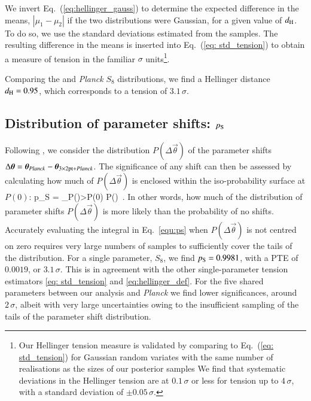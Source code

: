\begin{appendix}
We invert Eq.~(\ref{eq:hellinger_gauss}) to determine the expected difference in the means, $|\mu_1 - \mu_2|$ if the two distributions were Gaussian, for a given value of $d_{\rm H}$. To do so, we use the standard deviations estimated from the samples. The resulting difference in the means is inserted into Eq.~(\ref{eq: std_tension}) to obtain a measure of tension in the familiar $\sigma$ units\footnote{Our Hellinger tension measure is validated by comparing to Eq.~(\ref{eq: std_tension}) for Gaussian random variates with the same number of realisations as the sizes of our posterior samples %
We find that systematic deviations in the Hellinger tension are at $0.1\, \sigma$ or less for tension up to $4\,\sigma$, with a standard deviation of $\pm 0.05\, \sigma$.}.   

Comparing the \tttp and {\it Planck} $S_8$ distributions, we find a Hellinger distance $d_{\rm H}=0.95$, which corresponds to a tension of $3.1\,\sigma$.

\subsection{Distribution of parameter shifts: $p_{\rm S}$}
\label{app:paramshift} 
Following \citet[][see also \citealt{kohlinger/etal:2019}]{Raveri2020}, we consider the distribution $P(\Delta\vec\theta)$ of the parameter shifts $\Delta\vec\theta = \vec\theta_{\it Planck} - \vec\theta_{{\rm 3\times2pt+}{\it Planck}}$. 
The significance of any shift can then be assessed by calculating how much of $P(\Delta\vec\theta)$ is enclosed within the iso-probability surface at $P(0)$:
\be
\label{equ:ps}
	p_{\rm S} = \int_{P(\Delta\vec\theta)>P(0)} P(\Delta\vec\theta)\diff\Delta\vec\theta \, .
\ee
In other words, how much of the distribution of parameter shifts $P(\Delta\vec\theta)$ is more likely than the probability of no shifts. 
Accurately evaluating the integral in Eq.~\eqref{equ:ps} when $P(\Delta\vec\theta)$ is not centred on zero requires very large numbers of samples to sufficiently cover the tails of the distribution. 
For a single parameter, $S_{8}$, we find $p_{\rm S} = 0.9981$, with a PTE of $0.0019$, or $3.1\,\sigma$. 
This is in agreement with the other single-parameter tension estimators \eqref{eq: std_tension} and \eqref{eq:hellinger_def}. 
For the five shared parameters between our \tttp analysis and {\it Planck} we find lower significances, around $2\, \sigma$, albeit with very large uncertainties owing to the insufficient sampling of the tails of the parameter shift distribution. 


\end{appendix}
